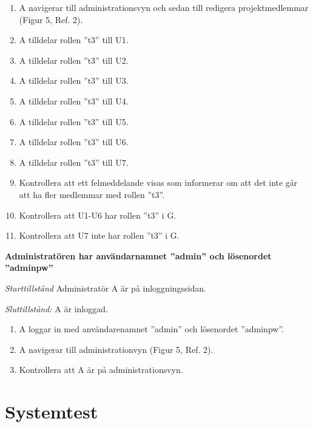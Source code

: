 \documentclass[a4paper]{article}
\begin{document}
\begin{FT}
\begin{enumerate}
\item A navigerar till administrationsvyn och sedan till redigera projektmedlemmar (Figur 5, Ref. 2).
\item A tilldelar rollen ''t3'' till U1.
\item A tilldelar rollen ''t3'' till U2.
\item A tilldelar rollen ''t3'' till U3.
\item A tilldelar rollen ''t3'' till U4.
\item A tilldelar rollen ''t3'' till U5.
\item A tilldelar rollen ''t3'' till U6.
\item A tilldelar rollen ''t3'' till U7.
\item Kontrollera att ett felmeddelande visas som informerar om att det inte går att ha fler medlemmar med rollen ''t3''.
\item Kontrollera att U1-U6 har rollen ''t3'' i G.
\item Kontrollera att U7 inte har rollen ''t3'' i G.
\end{enumerate}

\item
\textbf{Administratören har användarnamnet ''admin'' och lösenordet ''adminpw''}

\emph{Starttillstånd} Administratör A är på inloggningssidan.

\emph{Sluttillstånd:} A är inloggad.

\begin{enumerate}
\item A loggar in med användarenamnet ''admin'' och lösenordet ''adminpw''.
\item A navigerar till administrationvyn (Figur 5, Ref. 2).
\item Kontrollera att A är på administrationsvyn.
\end{enumerate}
\end{FT}






\newpage


\section{Systemtest}
\end{document}
